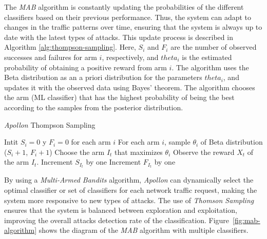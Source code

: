 The \textit{MAB} algorithm is constantly updating the probabilities of the different classifiers based on their previous
performance.
Thus, the system can adapt to changes in the traffic patterns over time, ensuring that the system is always up to date
with the latest types of attacks.
This update process is described in Algorithm \ref{alg:thompson-sampling}.
Here, $S_i$ and $F_i$ are the number of observed successes and failures for arm $i$, respectively, and $theta_i$ 
is the estimated probability of obtaining a positive reward from arm $i$.
The algorithm uses the Beta distribution as an a priori distribution for the parameters $theta_i$, and updates it
with the observed data using Bayes' theorem.
The algorithm chooses the arm (ML classifier) that has the highest probability of being the best according to the
samples from the posterior distribution.

\begin{algorithm} 
    \caption{\textit{Apollon} Thompson Sampling}
    \label{alg:thompson-sampling}
    \begin{algorithmic}
        \State Intit $S_i = 0$ y $F_i = 0$ for each arm $i$
            \State For each arm $i$, sample $\theta_i$ of Beta distribution ($S_i + 1$, $F_i + 1$)
            \State Choose the arm $I_t$ that maximizes $\theta_i$
            \State Observe the reward $X_t$ of the arm $I_t$.
                \State Increment $S_{I_t}$ by one
            \Else
                \State Increment $F_{I_t}$ by one
            \EndIf
        \EndFor 
    \end{algorithmic} 
\end{algorithm}

By using a \textit{Multi-Armed Bandits} algorithm, \textit{Apollon} can dynamically select the optimal classifier or set of classifiers
for each network traffic request, making the system more responsive to new types of attacks.
The use of \textit{Thomson Sampling} ensures that the system is balanced between exploration and exploitation, improving the
overall attacks detection rate of the classification.
Figure~\ref{fig:mab-algorithm} shows the diagram of the \textit{MAB} algorithm with multiple classifiers.

